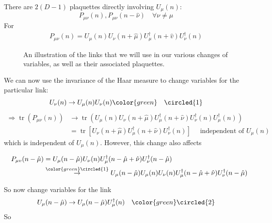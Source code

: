 \begin{itemize}
\begin{itemize}
        There are $2(D-1)$ plaquettes directly involving $U_\mu(n)$:
        \begin{equation}
            P_{\mu \nu}(n), P_{\mu \nu}(n - \hat{\nu}) \quad \forall \nu \neq \mu
        \end{equation}
        For
        \begin{equation}
        \begin{gathered}
        P_{\mu \nu}(n)=U_{\mu}(n) U_{\nu}(n+\hat{\mu}) U_{\mu}^{\dagger}(n+\hat{v}) U_{\nu}^{\dagger}(n)
        \end{gathered}
        \end{equation}
\begin{figure}
\caption{An illustration of the links that we will use in our various changes of variables, as well as their associated plaquettes.}
\end{figure}
We can now use the invariance of the Haar measure to change variables for the particular link:
\begin{equation}
U_{\nu}(n) \rightarrow U_{\mu}(n) U_{\nu}(n) \color{green} \quad \circled{1} 
\end{equation}
\begin{equation}
\begin{aligned}
 \Rightarrow \operatorname{tr}\left(P_{\mu \nu}(n)\right) &\rightarrow \operatorname{tr}\left(U_{\mu}(n) U_{\nu}(n+\hat{\mu}) U_{\mu}^{\dagger}(n+\hat{\nu}) U_{\nu}^{\dagger}(n) U_{\mu}^{\dagger}(n)\right) \\
&=\operatorname{tr}\left[U_{\nu}(n+\hat{\mu}) U_{\mu}^{\dagger}(n+\hat{\nu}) U_{\nu}^{\dagger}(n)\right] \quad \text { independent of } U_{\mu}(n)
\end{aligned}
\end{equation}
which is independent of  $U_{\mu}(n)$.
However, this change also affects

\begin{equation}
\begin{aligned}
\quad P_{\mu v}(n-\hat{\mu})&=U_{\mu}(n-\hat{\mu}) U_{\nu}(n) U_{\mu}^{\dagger}(n-\hat{\mu}+\hat{\nu}) U_{\nu}^{\dagger}(n-\hat{\mu}) \\
&  \stackrel{{\tiny{\color{green} \circled{1}}}}{\rightarrow} U_{\mu}(n-\hat{\mu}) U_{\mu}(n) U_{\nu}(n) U_{\mu}^{\dagger}(n-\hat{\mu}+\hat{\nu}) U_{\nu}^{\dagger}(n-\hat{\mu})
\end{aligned}
\end{equation}

So now change variables for the link
\begin{equation}
  U_{\mu}(n-\hat{\mu}) \rightarrow U_{\mu}(n-\hat{\mu}) U_{\mu}^{\dagger}(n) \quad {\color{green}\circled{2}}  
\end{equation}
So


\end{itemize}
\end{itemize}
